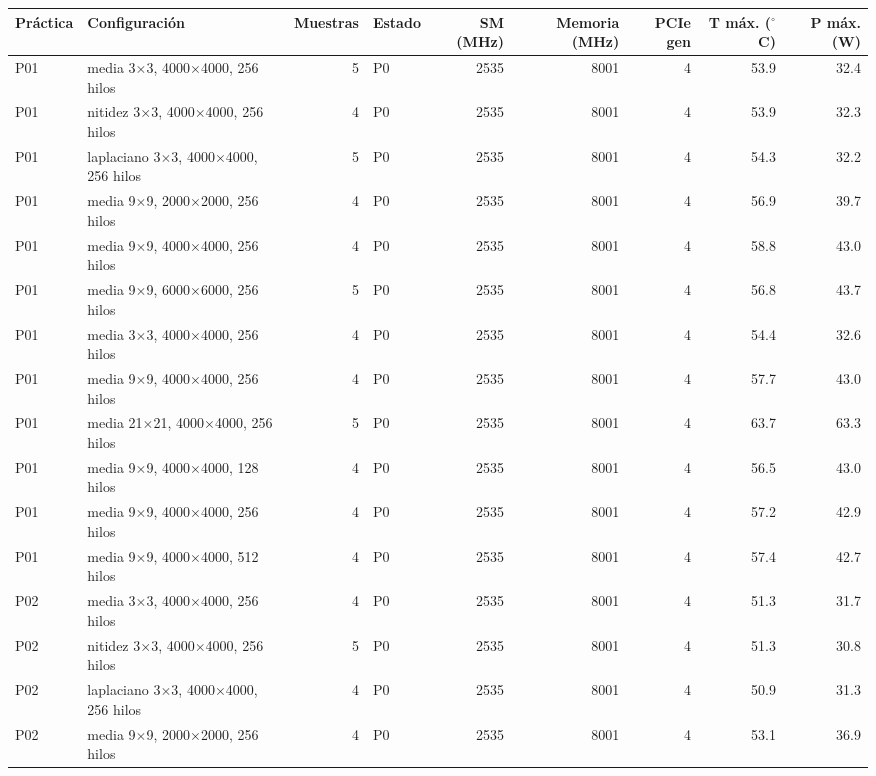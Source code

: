\begin{tabular}{llrlrrrrr}
\toprule
Práctica & Configuración & Muestras & Estado & SM (MHz) & Memoria (MHz) & PCIe gen & T máx. ($^\circ$C) & P máx. (W) \\
\midrule
P01 & media 3$\times$3, 4000$\times$4000, 256 hilos & 5 & P0 & 2535 & 8001 & 4 & 53.9 & 32.4 \\
P01 & nitidez 3$\times$3, 4000$\times$4000, 256 hilos & 4 & P0 & 2535 & 8001 & 4 & 53.9 & 32.3 \\
P01 & laplaciano 3$\times$3, 4000$\times$4000, 256 hilos & 5 & P0 & 2535 & 8001 & 4 & 54.3 & 32.2 \\
P01 & media 9$\times$9, 2000$\times$2000, 256 hilos & 4 & P0 & 2535 & 8001 & 4 & 56.9 & 39.7 \\
P01 & media 9$\times$9, 4000$\times$4000, 256 hilos & 4 & P0 & 2535 & 8001 & 4 & 58.8 & 43.0 \\
P01 & media 9$\times$9, 6000$\times$6000, 256 hilos & 5 & P0 & 2535 & 8001 & 4 & 56.8 & 43.7 \\
P01 & media 3$\times$3, 4000$\times$4000, 256 hilos & 4 & P0 & 2535 & 8001 & 4 & 54.4 & 32.6 \\
P01 & media 9$\times$9, 4000$\times$4000, 256 hilos & 4 & P0 & 2535 & 8001 & 4 & 57.7 & 43.0 \\
P01 & media 21$\times$21, 4000$\times$4000, 256 hilos & 5 & P0 & 2535 & 8001 & 4 & 63.7 & 63.3 \\
P01 & media 9$\times$9, 4000$\times$4000, 128 hilos & 4 & P0 & 2535 & 8001 & 4 & 56.5 & 43.0 \\
P01 & media 9$\times$9, 4000$\times$4000, 256 hilos & 4 & P0 & 2535 & 8001 & 4 & 57.2 & 42.9 \\
P01 & media 9$\times$9, 4000$\times$4000, 512 hilos & 4 & P0 & 2535 & 8001 & 4 & 57.4 & 42.7 \\
\midrule
P02 & media 3$\times$3, 4000$\times$4000, 256 hilos & 4 & P0 & 2535 & 8001 & 4 & 51.3 & 31.7 \\
P02 & nitidez 3$\times$3, 4000$\times$4000, 256 hilos & 5 & P0 & 2535 & 8001 & 4 & 51.3 & 30.8 \\
P02 & laplaciano 3$\times$3, 4000$\times$4000, 256 hilos & 4 & P0 & 2535 & 8001 & 4 & 50.9 & 31.3 \\
P02 & media 9$\times$9, 2000$\times$2000, 256 hilos & 4 & P0 & 2535 & 8001 & 4 & 53.1 & 36.9 \\

\end{tabular}
